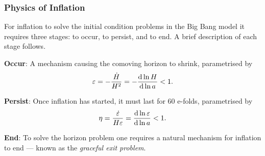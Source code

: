 \subsubsection{Physics of Inflation}

For inflation to solve the initial condition problems in the Big Bang model it requires three stages: to occur, to persist, and to end.
A brief description of each stage follows.

\begin{hangparas}{24pt}{1}
	\textbf{Occur}:
	A mechanism causing the comoving horizon to shrink, parametrised by
	\begin{equation}
		\varepsilon
		= -\frac{\dot{H}}{H^{2}}
		= -\dv{\ln{H}}{\ln{a}}
		< 1.
	\end{equation}

	\textbf{Persist}:
	Once inflation has started, it must last for 60 e-folds, parametrised by
	\begin{equation}
		\eta
		= \frac{\dot{\varepsilon}}{H\varepsilon}
		= \dv{\ln{\varepsilon}}{\ln{a}}
		< 1.
	\end{equation}

	\textbf{End}:
	To solve the horizon problem one requires a natural mechanism for inflation to end --- known as the \emph{graceful exit problem}.
\end{hangparas}

